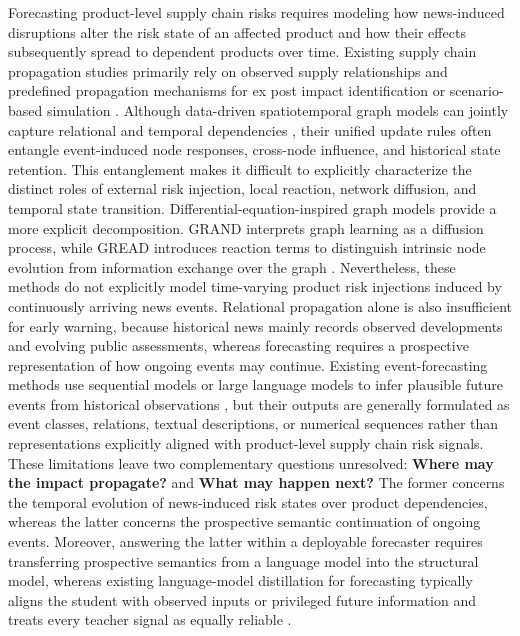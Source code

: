 \documentclass[letterpaper]{article} %
\begin{document}
Forecasting product-level supply chain risks requires modeling how news-induced disruptions alter the risk state of an affected product and how their effects subsequently spread to dependent products over time. Existing supply chain propagation studies primarily rely on observed supply relationships and predefined propagation mechanisms for ex post impact identification or scenario-based simulation \cite{carvalho2021supply,inoue2019firm,li2021ripple}. Although data-driven spatiotemporal graph models can jointly capture relational and temporal dependencies \cite{DBLP:conf/iclr/LiYS018,DBLP:conf/ijcai/YuYZ18}, their unified update rules often entangle event-induced node responses, cross-node influence, and historical state retention. This entanglement makes it difficult to explicitly characterize the distinct roles of external risk injection, local reaction, network diffusion, and temporal state transition. Differential-equation-inspired graph models provide a more explicit decomposition. GRAND interprets graph learning as a diffusion process, while GREAD introduces reaction terms to distinguish intrinsic node evolution from information exchange over the graph \cite{DBLP:conf/icml/0001RGBWR21,DBLP:conf/icml/00020PC23}. Nevertheless, these methods do not explicitly model time-varying product risk injections induced by continuously arriving news events. Relational propagation alone is also insufficient for early warning, because historical news mainly records observed developments and evolving public assessments, whereas forecasting requires a prospective representation of how ongoing events may continue. Existing event-forecasting methods use sequential models or large language models to infer plausible future events from historical observations \cite{DBLP:conf/aaai/HuLNLS17,DBLP:conf/nips/ShiXWZZZTM23,DBLP:journals/corr/abs-2407-01231}, but their outputs are generally formulated as event classes, relations, textual descriptions, or numerical sequences rather than representations explicitly aligned with product-level supply chain risk signals. These limitations leave two complementary questions unresolved: \textbf{Where may the impact propagate?} and \textbf{What may happen next?} The former concerns the temporal evolution of news-induced risk states over product dependencies, whereas the latter concerns the prospective semantic continuation of ongoing events. Moreover, answering the latter within a deployable forecaster requires transferring prospective semantics from a language model into the structural model, whereas existing language-model distillation for forecasting typically aligns the student with observed inputs or privileged future information and treats every teacher signal as equally reliable \cite{liu2025calf,liu2025timekd}.
\end{document}
